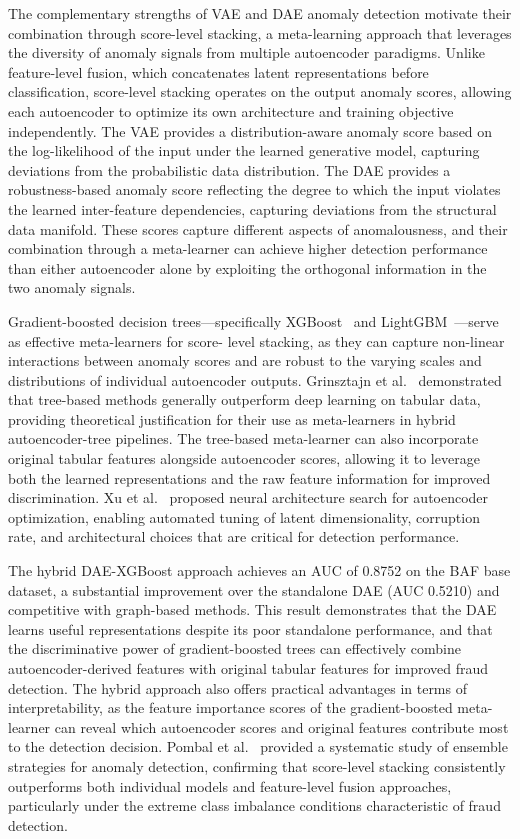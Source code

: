 The complementary strengths of VAE and DAE anomaly detection motivate their
combination through score-level stacking, a meta-learning approach that
leverages the diversity of anomaly signals from multiple autoencoder paradigms.
Unlike feature-level fusion, which concatenates latent representations before
classification, score-level stacking operates on the output anomaly scores,
allowing each autoencoder to optimize its own architecture and training
objective independently. The VAE provides a distribution-aware anomaly score
based on the log-likelihood of the input under the learned generative model,
capturing deviations from the probabilistic data distribution. The DAE provides
a robustness-based anomaly score reflecting the degree to which the input
violates the learned inter-feature dependencies, capturing deviations from the
structural data manifold. These scores capture different aspects of
anomalousness, and their combination through a meta-learner can achieve higher
detection performance than either autoencoder alone by exploiting the orthogonal
information in the two anomaly signals.

Gradient-boosted decision trees---specifically XGBoost~\cite{chen2016xgboost}
and LightGBM~\cite{ke2017lightgbm}---serve as effective meta-learners for score-
level stacking, as they can capture non-linear interactions between anomaly
scores and are robust to the varying scales and distributions of individual
autoencoder outputs. Grinsztajn et al.~\cite{grinsztajn2022tree} demonstrated
that tree-based methods generally outperform deep learning on tabular data,
providing theoretical justification for their use as meta-learners in hybrid
autoencoder-tree pipelines. The tree-based meta-learner can also incorporate
original tabular features alongside autoencoder scores, allowing it to leverage
both the learned representations and the raw feature information for improved
discrimination. Xu et al.~\cite{xu2019neural} proposed neural architecture
search for autoencoder optimization, enabling automated tuning of latent
dimensionality, corruption rate, and architectural choices that are critical for
detection performance.

The hybrid DAE-XGBoost approach achieves an AUC of 0.8752 on the BAF base
dataset, a substantial improvement over the standalone DAE (AUC 0.5210) and
competitive with graph-based methods. This result demonstrates that the DAE
learns useful representations despite its poor standalone performance, and that
the discriminative power of gradient-boosted trees can effectively combine
autoencoder-derived features with original tabular features for improved fraud
detection. The hybrid approach also offers practical advantages in terms of
interpretability, as the feature importance scores of the gradient-boosted meta-
learner can reveal which autoencoder scores and original features contribute
most to the detection decision. Pombal et al.~\cite{pombal2022understanding}
provided a systematic study of ensemble strategies for anomaly detection,
confirming that score-level stacking consistently outperforms both individual
models and feature-level fusion approaches, particularly under the extreme class
imbalance conditions characteristic of fraud detection.

